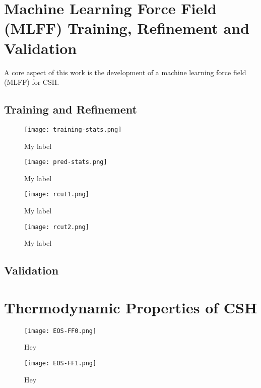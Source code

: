 \section{Machine Learning Force Field (MLFF) Training, Refinement and Validation}
A core aspect of this work is the development of a machine learning force field (MLFF) for CSH. 
\subsection{Training and Refinement}

\begin{figure}[h]
    \centering
    \texttt{[image: training-stats.png]}
    \caption{
    My label
    }
    \label{training-stats}
\end{figure}


\begin{figure}[h]
    \centering
    \texttt{[image: pred-stats.png]}
    \caption{
    My label
    }
    \label{pred-stats}
\end{figure}


\begin{figure}[h]
    \centering
    \texttt{[image: rcut1.png]}
    \caption{
    My label
    }
    \label{rcut1}
\end{figure}

\begin{figure}[h]
    \centering
    \texttt{[image: rcut2.png]}
    \caption{
    My label
    }
    \label{rcut2}
\end{figure}

\subsection{Validation}


\section{Thermodynamic Properties of CSH}




\begin{figure}[h]
    \centering
    \texttt{[image: EOS-FF0.png]}
    \caption{Hey}
    \label{fig:eos-ff0}
\end{figure}


\begin{figure}[h]
    \centering
    \texttt{[image: EOS-FF1.png]}
    \caption{Hey}
    \label{fig:eos-ff1}
\end{figure}

